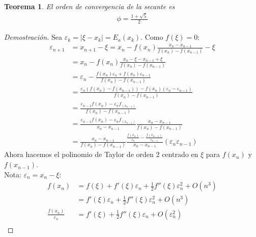 \documentclass{article}
\newtheorem{theo}{Teorema}
\begin{document}
\begin{theo}
    El orden de convergencia de la secante es
    \begin{equation}
        \begin{split}
            \phi = \frac{1+\sqrt{5}}{2}
        \end{split}
    \end{equation}
\end{theo}
\begin{proof}[Demostración]
    Sea $\varepsilon _{k} = |\xi -x_{k}| = E_{a}(x_{k})$. Como $f(\xi )=0$:
    \begin{equation}
        \begin{split}
            \varepsilon _{n+1}&=x_{n+1}-\xi = x_{n}-f(x_{n}) \frac{x_{n}-x_{n-1}}{f(x_{n})-f(x_{n-1})}
            - \xi \\
            &=x_{n} - f(x_{n}) \frac{x_{n}-\xi -x_{n-1}+\xi }{f(x_{n})-f(x_{n-1})}\\
            &=\varepsilon _{n} - \frac{f(x_{n})\varepsilon _{n}+f(x_{n})\varepsilon _{n-1}}
            {f(x_{n})-f(x_{n-1})}\\
            &= \frac{\varepsilon _{n}(f(x_{n})-f(x_{n-1}))- 
            f(x_{n})(\varepsilon _{n}-\varepsilon _{n-1})}{f(x_{n})-f(x_{n-1})}\\
            &=\frac{\varepsilon _{n-1}f(x_{n})-\varepsilon _{n}f_(x_{n-1})}{f(x_{n})-f(x_{n-1})}\\
            &=\frac{\varepsilon _{n-1}f(x_{n})-\varepsilon _{n}f_(x_{n-1})}{x_{n}-x_{n-1}}
            \frac{x_{n}-x_{n-1}}{f(x_{n})-f(x_{n-1})}\\
            &=\frac{x_{n}-x_{n-1}}{f(x_{n})-f(x_{n-1})} \frac{\frac{f(x_{n})}{\varepsilon _{n}}
            -\frac{f(x_{n-1})}{\varepsilon _{n-1}}}{x_{n}-x_{n-1}}(\varepsilon _{n}\varepsilon _{n-1})
        \end{split}
    \end{equation}
    Ahora hacemos el polinomio de Taylor de orden 2 centrado en $\xi $ para $f(x_{n})$ y $f(x_{n-1})$.\\
    Nota: $\varepsilon _{n} = x_{n}-\xi $:  
    \begin{equation}
        \begin{split}
            f(x_{n})&= f(\xi ) + f'(\xi )\varepsilon _{n} + \frac{1}{2}f''(\xi ) \varepsilon _{n}^{2}
            +O(n^{3})\\
            &= f'(\xi )\varepsilon _{n} + \frac{1}{2}f''(\xi )\varepsilon _{n}^{2}+O(n^{3})\\
            \frac{f(x_{n})}{\varepsilon _{n}}&=f'(\xi )+\frac{1}{2}f''(\xi )\varepsilon _{n}+O(\varepsilon _{n}^{2})\\

\end{split}
\end{equation}
\end{proof}
\end{document}
